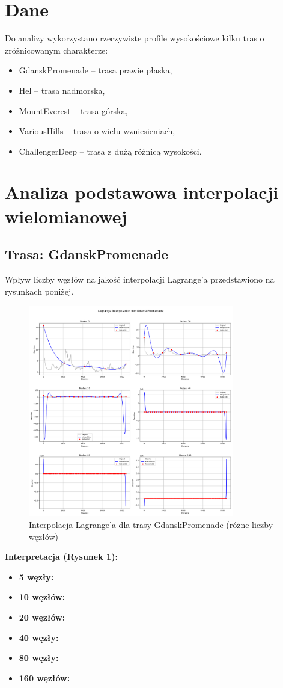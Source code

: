 \documentclass[11pt,a4paper]{article}
\begin{document}
\section{Dane}
Do analizy wykorzystano rzeczywiste profile wysokościowe kilku tras o zróżnicowanym charakterze:
\begin{itemize}
    \item GdanskPromenade -- trasa prawie płaska,
    \item Hel -- trasa nadmorska,
    \item MountEverest -- trasa górska,
    \item VariousHills -- trasa o wielu wzniesieniach,
    \item ChallengerDeep -- trasa z dużą różnicą wysokości.
\end{itemize}

\section{Analiza podstawowa interpolacji wielomianowej}
\subsection{Trasa: GdanskPromenade}
Wpływ liczby węzłów na jakość interpolacji Lagrange'a przedstawiono na rysunkach poniżej.

\begin{figure}[H]
    \centering
    \includegraphics[width=0.8\textwidth]{plots/GdanskPromenade_Lagrange_basic.png}
    \caption{Interpolacja Lagrange'a dla trasy GdanskPromenade (różne liczby węzłów)}
    \label{fig:promenade_lagrange}
\end{figure}
\textbf{Interpretacja (Rysunek \ref{fig:promenade_lagrange}):} 
\begin{itemize}
    \item \textbf{5 węzły:}
    \item \textbf{10 węzłów:}
    \item \textbf{20 węzłów:}
    \item \textbf{40 węzły:} 
    \item \textbf{80 węzły:} 
    \item \textbf{160 węzłów:} 
\end{itemize}
\end{document}
